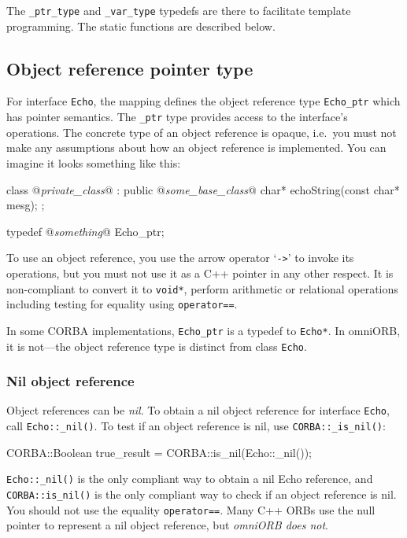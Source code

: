 \documentclass[11pt,twoside,a4paper]{book}
\newcommand{\type}[1]{\texttt{#1}}
\newcommand{\intf}[1]{\texttt{#1}}
\newcommand{\code}[1]{\texttt{#1}}
\newcommand{\op}[1]{\texttt{#1()}}
\begin{document}
The \type{\_ptr\_type} and \type{\_var\_type} typedefs are there to
facilitate template programming. The static functions are described
below.


\subsection{Object reference pointer type}

For interface \intf{Echo}, the mapping defines the object reference
type \type{Echo\_ptr} which has pointer semantics. The \type{\_ptr}
type provides access to the interface's operations. The concrete type
of an object reference is opaque, i.e.\ you must not make any
assumptions about how an object reference is implemented. You can
imagine it looks something like this:

\begin{cxxlisting}
class @\textit{private\_class}@ : public @\textit{some\_base\_class}@ {
  char* echoString(const char* mesg);
};

typedef @\textit{something}@ Echo_ptr;
\end{cxxlisting}

To use an object reference, you use the arrow operator `\code{->}' to
invoke its operations, but you must not use it as a C++ pointer in any
other respect. It is non-compliant to convert it to \type{void*},
perform arithmetic or relational operations including testing for
equality using \code{operator==}.

In some CORBA implementations, \type{Echo\_ptr} is a typedef to
\type{Echo*}. In omniORB, it is not---the object reference type is
distinct from class \type{Echo}.


\subsubsection{Nil object reference}

Object references can be \emph{nil}. To obtain a nil object reference
for interface \type{Echo}, call \op{Echo::\_nil}. To test if an
object reference is nil, use \op{CORBA::\_is\_nil}:

\begin{cxxlisting}
CORBA::Boolean true_result = CORBA::is_nil(Echo::_nil());
\end{cxxlisting}

\op{Echo::\_nil} is the only compliant way to obtain a nil Echo
reference, and \op{CORBA::is\_nil} is the only compliant way to check
if an object reference is nil. You should not use the equality
\code{operator==}. Many C++ ORBs use the null pointer to represent a
nil object reference, but \emph{omniORB does not}.
\end{document}
